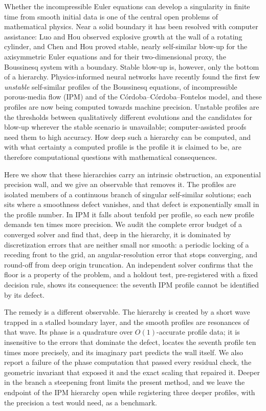 \documentclass[11pt]{article}
\begin{document}
Whether the incompressible Euler equations can develop a singularity in finite time from smooth initial data is one
of the central open problems of mathematical physics. Near a solid boundary it has been resolved with computer
assistance: Luo and Hou observed explosive growth at the wall of a rotating cylinder\cite{luo2014}, and Chen and Hou
proved stable, nearly self-similar blow-up for the axisymmetric Euler equations and for their two-dimensional proxy,
the Boussinesq system with a boundary\cite{chen2022,chen2023}. Stable blow-up is, however, only the bottom of a
hierarchy. Physics-informed neural networks\cite{raissi2019,wang2023} have recently found the first few
\emph{unstable} self-similar profiles of the Boussinesq equations, of incompressible porous-media flow (IPM) and of
the C\'ordoba--C\'ordoba--Fontelos model\cite{wang2025,ccf2005}, and these profiles are now being computed towards
machine precision\cite{wang2025b}. Unstable profiles are the thresholds between qualitatively different evolutions
and the candidates for blow-up wherever the stable scenario is unavailable; computer-assisted proofs need them to
high accuracy\cite{chen2023,gomezserrano2019,buckmaster2022}. How deep such a hierarchy can be computed, and with
what certainty a computed profile is the profile it is claimed to be, are therefore computational questions with
mathematical consequences.

Here we show that these hierarchies carry an intrinsic obstruction, an exponential precision wall, and we give an
observable that removes it. The profiles are isolated members of a continuous branch of singular self-similar
solutions; each sits where a smoothness defect vanishes, and that defect is exponentially small in the profile
number. In IPM it falls about tenfold per profile, so each new profile demands ten times more precision. We audit
the complete error budget of a converged solver and find that, deep in the hierarchy, it is dominated by
discretization errors that are neither small nor smooth: a periodic locking of a receding front to the grid, an
angular-resolution error that stops converging, and round-off from deep origin truncation. An independent solver
confirms that the floor is a property of the problem, and a holdout test, pre-registered with a fixed decision
rule, shows its consequence: the seventh IPM profile cannot be identified by its defect.

The remedy is a different observable. The hierarchy is created by a short wave trapped in a stalled boundary layer,
and the smooth profiles are resonances of that wave. Its phase is a quadrature over $O(1)$-accurate profile data; it
is insensitive to the errors that dominate the defect, locates the seventh profile ten times more precisely, and its
imaginary part predicts the wall itself. We also report a failure of the phase computation that passed every
residual check, the geometric invariant that exposed it and the exact scaling that repaired it. Deeper in the branch
a steepening front limits the present method, and we leave the endpoint of the IPM hierarchy open while registering
three deeper profiles, with the precision a test would need, as a benchmark.
\end{document}
